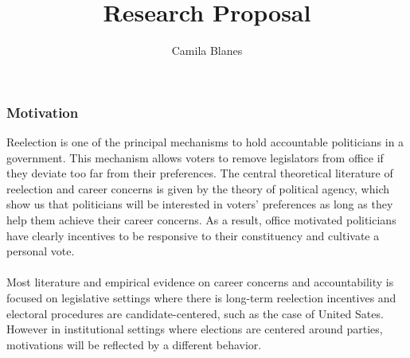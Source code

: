 \documentclass{article}
\title{Research Proposal}
\author{Camila Blanes}
\date{}
\begin{document}
	\maketitle

\subsubsection*{Motivation}

Reelection is one of the principal mechanisms to hold accountable politicians in a government. This mechanism allows voters to remove legislators from office if they deviate too far from their preferences. The central theoretical literature of reelection and career concerns is given by the theory of political agency, which show us that politicians will be interested in voters' preferences as long as they help them achieve their career concerns. As a result, office motivated politicians have clearly incentives to be responsive to their constituency and cultivate a personal vote. \\
\\
Most literature and empirical evidence on career concerns and accountability is focused on legislative settings where there is long-term reelection incentives and electoral procedures are candidate-centered, such as the case of United Sates. However in institutional settings where elections are centered around parties, motivations will be reflected by a different behavior. 
\end{document}
